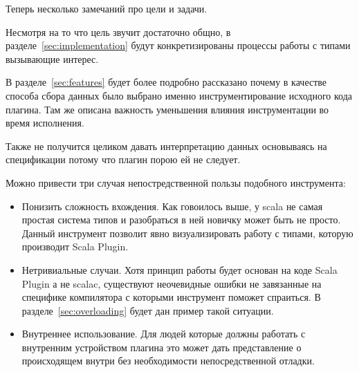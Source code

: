 Теперь несколько замечаний про цели и задачи.

Несмотря на то что цель звучит достаточно общно, в
разделе~\ref{sec:implementation} будут конкретизированы процессы работы с типами
вызывающие интерес.

В разделе~\ref{sec:features} будет более подробно
рассказано почему в качестве способа сбора данных было выбрано именно
инструментирование исходного кода плагина.
Там же описана важность уменьшения влияния инструментации во время исполнения.

Также не получится целиком давать интерпретацию данных основываясь на спецификации
потому что плагин порою ей не следует.

Можно привести три случая непостредственной пользы подобного инструмента:
\begin{itemize}
  \item Понизить сложность вхождения.
  Как говоилось выше, у scala не самая простая система типов и разобраться
  в ней новичку может быть не просто.
  Данный инструмент позволит явно визуализировать работу с типами, которую
  производит Scala Plugin.
  \item Нетривиальные случаи.
  Хотя принцип работы будет основан на коде Scala Plugin а не scalac,
  существуют неочевидные ошибки не завязанные на специфике компилятора с которыми
  инструмент поможет спраиться.
  В разделе~\ref{sec:overloading} будет дан пример такой ситуации.
  \item Внутреннее использование.
  Для людей которые должны работать с внутренним устройством плагина это может
  дать представление о происходящем внутри без необходимости непосредственной
  отладки.
\end{itemize}
